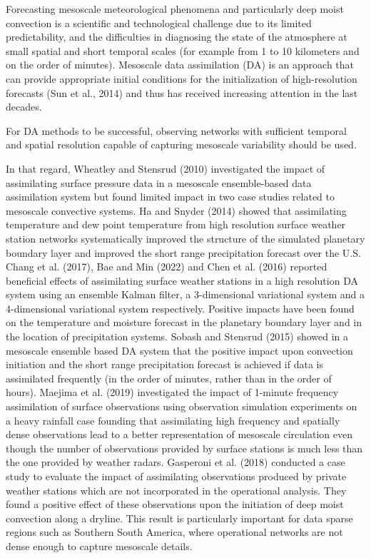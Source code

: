 \documentclass[final,5p,times,twocolumn,authoryear]{elsarticle} %
\begin{document}
Forecasting mesoscale meteorological phenomena and particularly deep moist convection is a scientific and technological challenge due to its limited predictability, and the difficulties in diagnosing the state of the atmosphere at small spatial and short temporal scales (for example from 1 to 10 kilometers and on the order of minutes). Mesoscale data assimilation (DA) is an approach that can provide appropriate initial conditions for the initialization of high-resolution forecasts (Sun et al., 2014) and thus has received increasing attention in the last decades.

For DA methods to be successful, observing networks with sufficient temporal and spatial resolution capable of capturing mesoscale variability should be used.

In that regard, Wheatley and Stensrud (2010) investigated the impact of assimilating surface pressure data in a mesoscale ensemble-based data assimilation system but found limited impact in two case studies related to mesoscale convective systems. Ha and Snyder (2014) showed that assimilating temperature and dew point temperature from high resolution surface weather station networks systematically improved the structure of the simulated planetary boundary layer and improved the short range precipitation forecast over the U.S. Chang et al. (2017), Bae and Min (2022) and Chen et al. (2016) reported beneficial effects of assimilating surface weather stations in a high resolution DA system using an ensemble Kalman filter, a 3-dimensional variational system and a 4-dimensional variational system respectively. Positive impacts have been found on the temperature and moisture forecast in the planetary boundary layer and in the location of precipitation systems. Sobash and Stensrud (2015) showed in a mesoscale ensemble based DA system that the positive impact upon convection initiation and the short range precipitation forecast is achieved if data is assimilated frequently (in the order of minutes, rather than in the order of hours). Maejima et al. (2019) investigated the impact of 1-minute frequency assimilation of surface observations using observation simulation experiments on a heavy rainfall case founding that assimilating high frequency and spatially dense observations lead to a better representation of mesoscale circulation even though the number of observations provided by surface stations is much less than the one provided by weather radars. Gasperoni et al. (2018) conducted a case study to evaluate the impact of assimilating observations produced by private weather stations which are not incorporated in the operational analysis. They found a positive effect of these observations upon the initiation of deep moist convection along a dryline. This result is particularly important for data sparse regions such as Southern South America, where operational networks are not dense enough to capture mesoscale details.
\end{document}
